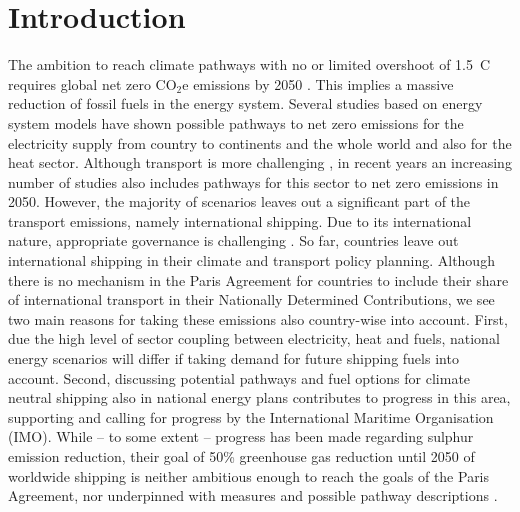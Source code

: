 \documentclass[article]{elsarticle}
\begin{document}

\section{Introduction}
The ambition to reach climate pathways with no or limited overshoot of 1.5~\degree C requires global net zero CO$_2$e emissions by 2050 \cite{IPCC2018}. This implies a massive reduction of fossil fuels in the energy system. Several studies based on energy system models have shown possible pathways to net zero emissions for the electricity supply from country to continents and the whole world \cite{Brown2018} and also for the heat sector. Although transport is more challenging \cite{Salvucci2018,Schafer2012}, in recent years an increasing number of studies also includes pathways for this sector to net zero emissions in 2050. However, the majority of scenarios leaves out a significant part of the transport emissions, namely international shipping. Due to its international nature, appropriate governance is challenging \cite{GRITSENKO2017}. So far, countries leave out international shipping in their climate and transport policy planning. Although there is no mechanism in the Paris Agreement for countries to include their share of international transport in their Nationally Determined Contributions, we see two main reasons for taking these emissions also country-wise into account. First, due the high level of sector coupling between electricity, heat and fuels, national energy scenarios will differ if taking demand for future shipping fuels into account. Second, discussing potential pathways and fuel options for climate neutral shipping also in national energy plans contributes to progress in this area, supporting and calling for progress by the International Maritime Organisation (IMO). While -- to some extent -- progress has been made regarding sulphur emission reduction, their goal of 50\% greenhouse gas reduction until 2050 of worldwide shipping \cite{IMO2018} is neither ambitious enough to reach the goals of the Paris Agreement, nor underpinned with measures and possible pathway descriptions \cite{Wan2018}.
\end{document}
